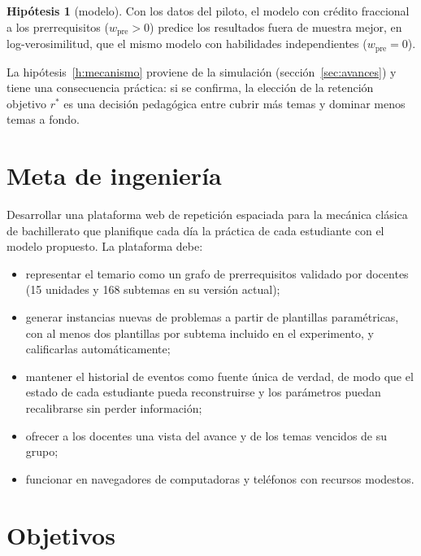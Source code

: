 \documentclass[12pt]{article}
\theoremstyle{definition}
\newtheorem{hipotesis}{Hipótesis}
\newcommand{\rstar}{r^{\ast}}
\begin{document}
\begin{hipotesis}[modelo]
\label{h:modelo}
Con los datos del piloto, el modelo con crédito fraccional a los prerrequisitos ($w_{\mathrm{pre}}>0$) predice los resultados fuera de muestra mejor, en log-verosimilitud, que el mismo modelo con habilidades independientes ($w_{\mathrm{pre}}=0$).
\end{hipotesis}

La hipótesis~\ref{h:mecanismo} proviene de la simulación (sección~\ref{sec:avances}) y tiene una consecuencia práctica: si se confirma, la elección de la retención objetivo $\rstar$ es una decisión pedagógica entre cubrir más temas y dominar menos temas a fondo.

\section{Meta de ingeniería}
\label{sec:meta}

Desarrollar una plataforma web de repetición espaciada para la mecánica clásica de bachillerato que planifique cada día la práctica de cada estudiante con el modelo propuesto. La plataforma debe:

\begin{itemize}
\item representar el temario como un grafo de prerrequisitos validado por docentes (15 unidades y 168 subtemas en su versión actual);
\item generar instancias nuevas de problemas a partir de plantillas paramétricas, con al menos dos plantillas por subtema incluido en el experimento, y calificarlas automáticamente;
\item mantener el historial de eventos como fuente única de verdad, de modo que el estado de cada estudiante pueda reconstruirse y los parámetros puedan recalibrarse sin perder información;
\item ofrecer a los docentes una vista del avance y de los temas vencidos de su grupo;
\item funcionar en navegadores de computadoras y teléfonos con recursos modestos.
\end{itemize}

\section{Objetivos}
\label{sec:objetivos}
\end{document}
